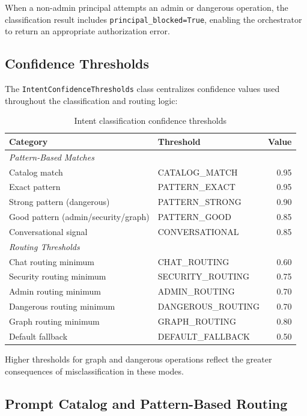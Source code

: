 When a non-admin principal attempts an admin or dangerous operation, the classification result includes \texttt{principal\_blocked=True}, enabling the orchestrator to return an appropriate authorization error.

\subsection{Confidence Thresholds}

The \texttt{IntentConfidenceThresholds} class centralizes confidence values used throughout the classification and routing logic:

\begin{table}[htbp]
\centering
\caption{Intent classification confidence thresholds}
\label{tab:confidence-thresholds}
\begin{tabular}{llr}
\hline
\textbf{Category} & \textbf{Threshold} & \textbf{Value} \\
\hline
\multicolumn{3}{l}{\textit{Pattern-Based Matches}} \\
Catalog match & CATALOG\_MATCH & 0.95 \\
Exact pattern & PATTERN\_EXACT & 0.95 \\
Strong pattern (dangerous) & PATTERN\_STRONG & 0.90 \\
Good pattern (admin/security/graph) & PATTERN\_GOOD & 0.85 \\
Conversational signal & CONVERSATIONAL & 0.85 \\
\hline
\multicolumn{3}{l}{\textit{Routing Thresholds}} \\
Chat routing minimum & CHAT\_ROUTING & 0.60 \\
Security routing minimum & SECURITY\_ROUTING & 0.75 \\
Admin routing minimum & ADMIN\_ROUTING & 0.70 \\
Dangerous routing minimum & DANGEROUS\_ROUTING & 0.70 \\
Graph routing minimum & GRAPH\_ROUTING & 0.80 \\
\hline
Default fallback & DEFAULT\_FALLBACK & 0.50 \\
\hline
\end{tabular}
\end{table}

Higher thresholds for graph and dangerous operations reflect the greater consequences of misclassification in these modes.

\subsection{Prompt Catalog and Pattern-Based Routing}
\label{subsec:prompt-catalog}

